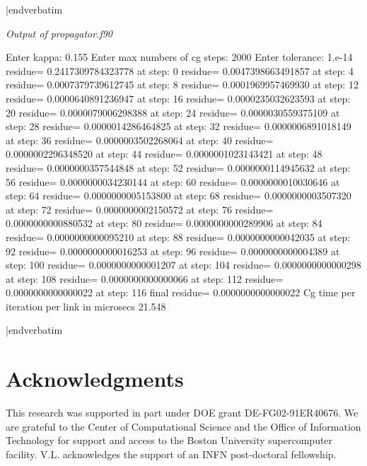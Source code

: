 {|endverbatim

{\it Output of propagator.f90}

\verbatim

Enter kappa:   0.155
Enter max numbers of cg steps:   2000
Enter tolerance:   1.e-14
residue=   0.2417309784323778 at step:    0
residue=   0.0047398663491857 at step:    4
residue=   0.0007379739612745 at step:    8
residue=   0.0001969957469930 at step:   12
residue=   0.0000640891236947 at step:   16
residue=   0.0000235032623593 at step:   20
residue=   0.0000079006298388 at step:   24
residue=   0.0000030559375109 at step:   28
residue=   0.0000014286464825 at step:   32
residue=   0.0000006891018149 at step:   36
residue=   0.0000003502268064 at step:   40
residue=   0.0000002296348520 at step:   44
residue=   0.0000001023143421 at step:   48
residue=   0.0000000357544848 at step:   52
residue=   0.0000000114945632 at step:   56
residue=   0.0000000034230144 at step:   60
residue=   0.0000000010030646 at step:   64
residue=   0.0000000005153800 at step:   68
residue=   0.0000000003507320 at step:   72
residue=   0.0000000002150572 at step:   76
residue=   0.0000000000880532 at step:   80
residue=   0.0000000000289906 at step:   84
residue=   0.0000000000095210 at step:   88
residue=   0.0000000000042035 at step:   92
residue=   0.0000000000016253 at step:   96
residue=   0.0000000000004389 at step:  100
residue=   0.0000000000001207 at step:  104
residue=   0.0000000000000298 at step:  108
residue=   0.0000000000000066 at step:  112
residue=   0.0000000000000022 at step:  116
final residue=   0.0000000000000022
Cg time per iteration per link in microsecs   21.548

|endverbatim
}


\section*{Acknowledgments}

This research was supported in part under DOE grant DE-FG02-91ER40676.
We are grateful to the Center of Computational Science and the Office
of Information Technology for support and access to the Boston
University supercomputer facility.
V.L. acknowledges the support of an INFN post-doctoral fellowship.



